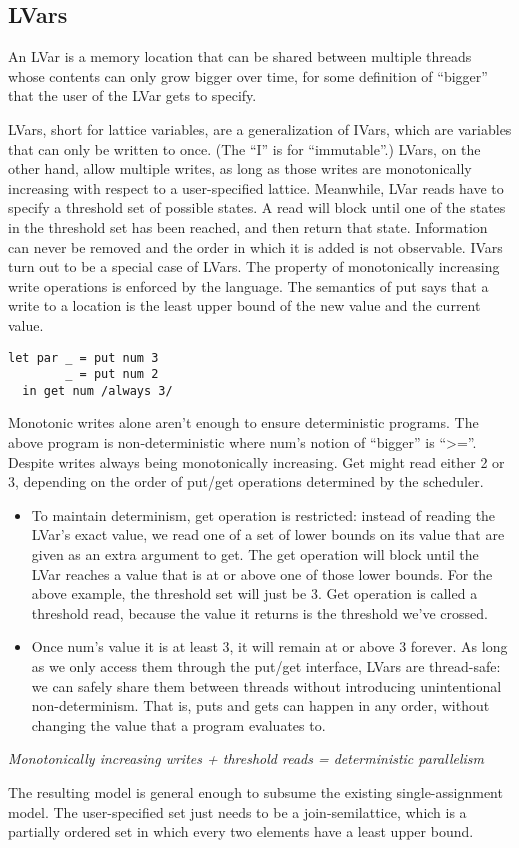 \documentclass[twocolumn]{article}
\begin{document}
\subsection{LVars}
An LVar is a memory location that can be shared between multiple threads whose contents can only grow bigger over time, for some definition of “bigger” that the user of the LVar gets to specify. \par
LVars, short for lattice variables, are a generalization of IVars, which are variables that can only be written to once. (The “I” is for “immutable”.) LVars, on the other hand, allow multiple writes, as long as those writes are monotonically increasing with respect to a user-specified lattice. Meanwhile, LVar reads have to specify a threshold set of possible states. A read will block until one of the states in the threshold set has been reached, and then return that state. Information can never be removed and the order in which it is added is not observable. IVars turn out to be a special case of LVars. 
The property of monotonically increasing write operations is enforced by the language. The semantics of put says that a write to a location is the least upper bound of the new value and the current value. 
\begin{lstlisting}
let par _ = put num 3
        _ = put num 2
  in get num /always 3/
\end{lstlisting}
Monotonic writes alone aren't enough to ensure deterministic programs. The above program is non-deterministic where num's notion of “bigger” is “>=”. Despite writes always being monotonically increasing. Get might read either 2 or 3, depending on the order of put/get operations determined by the scheduler. \par
\begin{itemize}
\item To maintain determinism, get operation is restricted: instead of reading the LVar’s exact value, we read one of a set of lower bounds on its value that are given as an extra argument to get. The get operation will block until the LVar reaches a value that is at or above one of those lower bounds. For the above example, the threshold set will just be  {3}. Get operation is called a threshold read, because the value it returns is the threshold we’ve crossed.
\item Once num's value it is at least 3, it will remain at or above 3 forever. As long as we only access them through the put/get interface, LVars are thread-safe: we can safely share them between threads without introducing unintentional non-determinism. That is, puts and gets can happen in any order, without changing the value that a program evaluates to.
\end{itemize}
\begin{center}
\textit{Monotonically increasing writes + threshold reads = deterministic parallelism}
\end{center}
The resulting model is general enough to subsume the existing single-assignment model.
The user-specified set just needs to be a join-semilattice, which is a partially ordered set in which every two elements have a least upper bound. 
\end{document}
